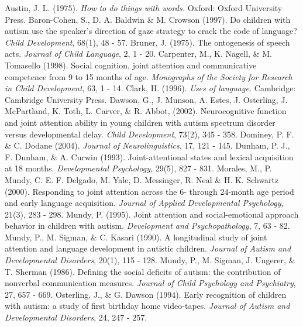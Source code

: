 \documentclass[12pt]{article}
\begin{document}
\begin{thebibliography}{99}
Austin, J. L. (1975). \emph{How to do things with words.} Oxford: Oxford University Press. 
Baron-Cohen, S., D. A. Baldwin \& M. Crowson (1997). Do children with autism use the speaker’s direction of gaze strategy to crack the code of language? \emph{Child Development}, 68(1), 48 - 57.
Bruner, J. (1975). The ontogenesis of speech acts. \emph{Journal of Child Language}, 2, 1 - 20.
Carpenter, M., K. Nagell, \& M. Tomasello (1998). Social cognition, joint attention and communicative competence from 9 to 15 months of age. \emph{Monographs of the Society for Research in Child Development}, 63, 1 - 14.
Clark, H. (1996). \emph{Uses of language.} Cambridge: Cambridge University Press.
Dawson, G., J. Munson, A. Estes, J. Osterling, J. McPartland, K. Toth, L. Carver, \& R. Abbot, (2002). Neurocognitive function and joint attention ability in young children with autism spectrum disorder versus developmental delay. \emph{Child Development}, 73(2), 345 - 358.
Dominey, P. F. \& C. Dodane (2004). \emph{Journal of Neurolinguistics}, 17, 121 - 145.
Dunham, P. J., F. Dunham, \& A. Curwin (1993). Joint-attentional states and lexical acquisition at 18 months. \emph{Developmental Psychology}, 29(5), 827 - 831.
Morales, M., P. Mundy, C. E. F. Delgado, M. Yale, D. Messinger, R. Neal \& H. K. Schwartz (2000). Responding to joint attention across the 6- through 24-month age period and early language acquisition. \emph{Journal of Applied Developmental Psychology}, 21(3), 283 - 298.
Mundy, P. (1995). Joint attention and social-emotional approach behavior in children with autism. \emph{Development and Psychopathology}, 7, 63 - 82.
Mundy, P., M. Sigman, \& C. Kasari (1990). A longitudinal study of joint attention and language development in autistic children. \emph{Journal of Autism and Developmental Disorders}, 20(1), 115 - 128.
Mundy, P., M. Sigman, J. Ungerer, \& T. Sherman (1986). Defining the social deficits of autism: the contribution of nonverbal communication measures. \emph{Journal of Child Psychology and Psychiatry}, 27, 657 - 669.
Osterling, J., \& G. Dawson (1994). Early recognition of children with autism: a study of first birthday home video-tapes. \emph{Journal of Autism and Developmental Disorders}, 24, 247 - 257.

\end{thebibliography}
\end{document}
